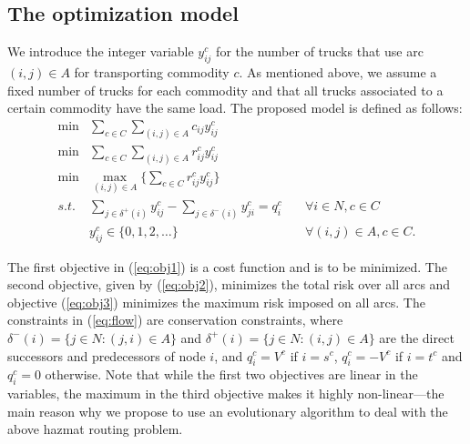 \documentclass[preprint,12pt]{elsarticle}
\begin{document}
\subsection{The optimization model} \label{SS_AOM}
We introduce the integer variable $y_{ij}^c$ for the number of trucks that use arc $(i,j)\in A$ for transporting commodity $c$. As mentioned above, we assume a fixed number of trucks for each commodity and that all trucks associated to a certain commodity have the same load. The proposed model is defined as follows:
\begin{eqnarray}
   \min  & \sum_{c \in C}\limits \sum_{(i,j) \in A}\limits c_{ij} y_{ij}^c & \label{eq:obj1}\\
   \min  & \sum_{c \in C}\limits \sum_{(i,j) \in A}\limits r_{ij}^{c} y_{ij}^c & \label{eq:obj2}\\
   \min  & \max_{(i,j)\in A}\limits \big\{ \sum_{c \in C}\limits r_{ij}^{c} y_{ij}^c \big\} & \label{eq:obj3}\\
    s.t. & \sum_{j \in \delta^+(i)}\limits y_{ij}^c -  \sum_{j \in \delta^-(i)}\limits y_{ji}^c = q_i^c\quad         & \forall i \in N,  c \in  C \label{eq:flow} \\
         & y_{ij}^c \in \{0, 1, 2, \ldots\}                                                            & \forall (i,j)\in A, c\in C\label{eq:integerY}.
\end{eqnarray}

The first objective in (\ref{eq:obj1}) is a cost function and is to be minimized. The second objective, given by (\ref{eq:obj2}), minimizes the total risk over all arcs and objective (\ref{eq:obj3}) minimizes the maximum risk imposed on all arcs. The constraints in (\ref{eq:flow}) are conservation constraints, where $\delta^-(i) = \{j \in N: (j,i)\in A\}$ and $\delta^+(i) = \{j \in N: (i,j)\in A\}$ are the direct successors and predecessors of node $i$, and $q_i^c=V^c$ if  $i=s^c$, $q_i^c=-V^c$ if  $i=t^c$ and $q_i^c=0$ otherwise. Note that while the first two objectives are linear in the variables, the maximum in the third objective makes it highly non-linear---the main reason why we propose to use an evolutionary algorithm to deal with the above hazmat routing problem.


\end{document}
